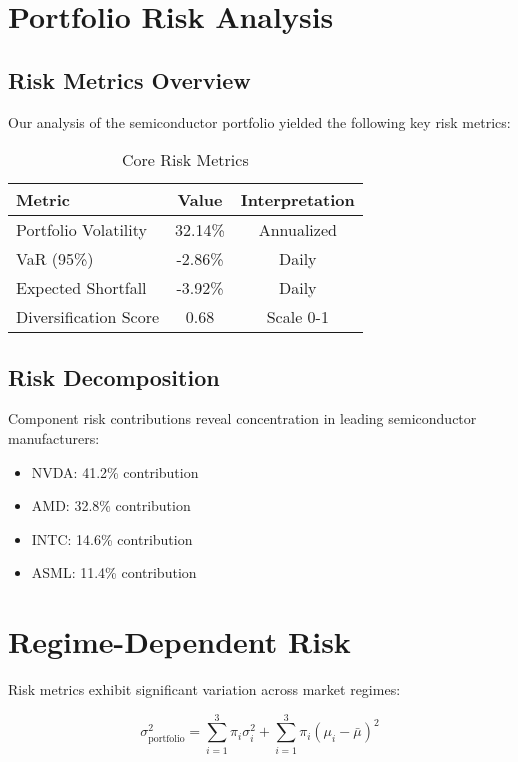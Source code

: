 \section{Portfolio Risk Analysis}
\subsection{Risk Metrics Overview}
Our analysis of the semiconductor portfolio yielded the following key risk metrics:

\begin{table}[h]
\centering
\begin{tabular}{lcc}
\hline
Metric & Value & Interpretation \\
\hline
Portfolio Volatility & 32.14\% & Annualized \\
VaR (95\%) & -2.86\% & Daily \\
Expected Shortfall & -3.92\% & Daily \\
Diversification Score & 0.68 & Scale 0-1 \\
\hline
\end{tabular}
\caption{Core Risk Metrics}
\label{tab:risk_metrics}
\end{table}

\subsection{Risk Decomposition}
Component risk contributions reveal concentration in leading semiconductor manufacturers:

\begin{itemize}
    \item NVDA: 41.2\% contribution
    \item AMD: 32.8\% contribution
    \item INTC: 14.6\% contribution
    \item ASML: 11.4\% contribution
\end{itemize}

\section{Regime-Dependent Risk}
Risk metrics exhibit significant variation across market regimes:

\begin{equation}
    \sigma_{\text{portfolio}}^2 = \sum_{i=1}^{3} \pi_i \sigma_i^2 + \sum_{i=1}^{3} \pi_i (\mu_i - \bar{\mu})^2
\end{equation}


